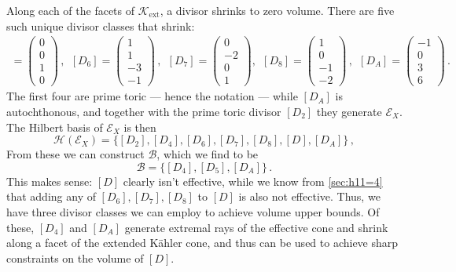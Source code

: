 \documentclass[11pt,dvipsnames]{article}
\theoremstyle{definition}
\begin{document}
Along each of the facets of $\mathcal{K}_{\text{ext}}$, a divisor shrinks to zero volume. There are five such unique divisor classes that shrink:
\begin{align}
    [D_4] = \begin{pmatrix}
        0 \\ 0 \\1 \\0
    \end{pmatrix}\,, \ \ 
    [D_6] = \begin{pmatrix}
        1 \\ 1 \\ -3 \\-1
    \end{pmatrix}\,, \ \
    [D_7] = \begin{pmatrix}
        0 \\ -2 \\0 \\1
    \end{pmatrix}, \ \
    [D_8] = \begin{pmatrix}
        1 \\ 0 \\-1 \\-2
    \end{pmatrix}\,, \ \
    [D_A] = \begin{pmatrix}
        -1 \\ 0 \\ 3 \\ 6
    \end{pmatrix}\,. 
\end{align}
The first four are prime toric --- hence the notation --- while $[D_A]$ is autochthonous, and together with the prime toric divisor $[D_2]$ they generate $\mathcal{E}_X$. The Hilbert basis of $\mathcal{E}_X$ is then 
\begin{equation}
    \mathcal{H}(\mathcal{E}_X) = \{[D_2], [D_4], [D_6], [D_7], [D_8], [D], [D_A]\}\,,
\end{equation}
From these we can construct $\mathcal{B}$, which we find to be
\begin{equation}
    \mathcal{B} = \{[D_4], [D_5], [D_A]\}\,.
\end{equation}
This makes sense: $[D]$ clearly isn't effective, while we know from \cref{sec:h11=4} that adding any of $[D_6], [D_7], [D_8]$ to $[D]$ is also not effective. Thus, we have three divisor classes we can employ to achieve volume upper bounds. Of these, $[D_4]$ and $[D_A]$ generate extremal rays of the effective cone and shrink along a facet of the extended K\"ahler cone, and thus can be used to achieve sharp constraints on the volume of $[D]$.
\end{document}

